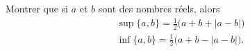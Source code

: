 

\begin{exercice}\label{exoSerieUn0009}

	Montrer que si $a$ et $b$ sont des nombres réels, alors 
	\begin{subequations}
		\begin{align}
			\sup\{ a,b \}=\frac{ 1 }{2}\big( a+b+| a-b | \big)\\			\label{SubEqsupexoSerUnab}
			\inf\{ a,b \}=\frac{ 1 }{2}\big( a+b-| a-b | \big).
		\end{align}
	\end{subequations}

\end{exercice}
